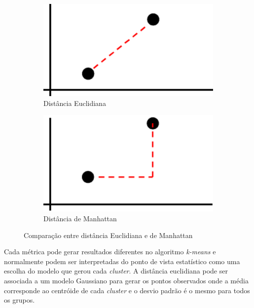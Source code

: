 \begin{figure}[h]
  \centering
  \begin{subfigure}{.5\textwidth}
    \centering
    \includegraphics[scale=0.5]{figuras/euclidean.eps}
    \caption{Distância Euclidiana}
  \end{subfigure}%
  \begin{subfigure}{.5\textwidth}
    \centering
    \includegraphics[scale=0.5]{figuras/manhattan.eps}
    \caption{Distância de Manhattan}
  \end{subfigure}
  \caption{Comparação entre distância Euclidiana e de Manhattan}
\end{figure}

Cada métrica pode gerar resultados diferentes no algoritmo \textit{k-means} e normalmente podem ser interpretadas do ponto de vista estatístico como uma escolha do modelo que gerou cada \textit{cluster}. A distância euclidiana pode ser associada a um modelo Gaussiano para gerar os pontos observados onde a média corresponde ao centróide de cada \textit{cluster} e o desvio padrão é o mesmo para todos os grupos.
